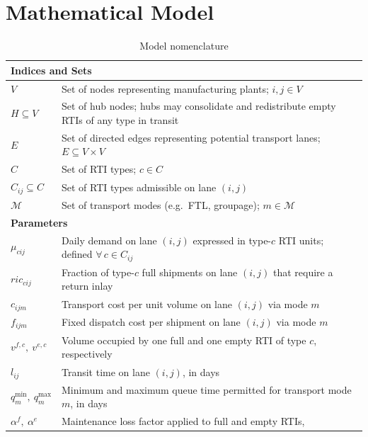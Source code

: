 \section{Mathematical Model}




\begin{longtable}{|p{}|p{}|}
\caption{Model nomenclature}
\label{tab:nomenclature}\\
\hline
\multicolumn{2}{|l|}{\textbf{Indices and Sets}}\\ \hline
$V$
  & Set of nodes representing manufacturing plants; $i, j \in V$ \\
$H \subseteq V$
  & Set of hub nodes; hubs may consolidate and redistribute empty
    RTIs of any type in transit \\
$E$
  & Set of directed edges representing potential transport lanes;
    $E \subseteq V \times V$ \\
$C$
  & Set of RTI types; $c \in C$ \\
$C_{ij} \subseteq C$
  & Set of RTI types admissible on lane $(i,j)$ \\
$\mathcal{M}$
  & Set of transport modes (e.g.\ FTL, groupage); $m \in \mathcal{M}$ \\
\hline
\multicolumn{2}{|l|}{\textbf{Parameters}}\\ \hline
$\mu_{cij}$
  & Daily demand on lane $(i,j)$ expressed in type-$c$ RTI units;
    defined $\forall\,c \in C_{ij}$ \\
$ric_{cij}$
  & Fraction of type-$c$ full shipments on lane $(i,j)$ that require
    a return inlay \\
$c_{ijm}$
  & Transport cost per unit volume on lane $(i,j)$ via mode $m$ \\
$f_{ijm}$
  & Fixed dispatch cost per shipment on lane $(i,j)$ via mode $m$ \\
$v^{f,c},\ v^{e,c}$
  & Volume occupied by one full and one empty RTI of type $c$,
    respectively \\
$l_{ij}$
  & Transit time on lane $(i,j)$, in days \\ 
$q^{\min}_{m},\ q^{\max}_{m}$
  & Minimum and maximum queue time permitted for transport
    mode $m$, in days \\
$\alpha^{f},\ \alpha^{e}$
  & Maintenance loss factor applied to full and empty RTIs,

\end{longtable}
